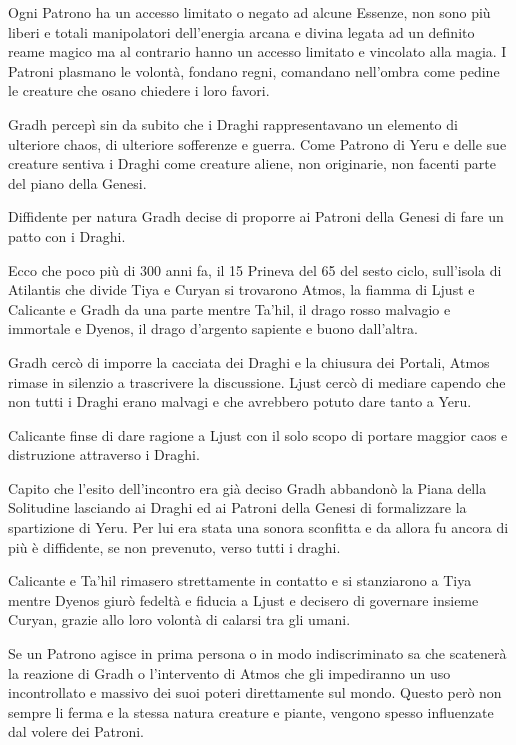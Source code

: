\documentclass[a4paper,11pt,twoside,openany]{book}
\begin{document}
{Ogni Patrono ha un accesso limitato o negato ad alcune Essenze, non sono più liberi e totali manipolatori dell'energia arcana e divina legata ad un definito reame magico ma al contrario hanno un accesso limitato e vincolato alla magia. 
I Patroni plasmano le volontà, fondano regni, comandano nell'ombra come pedine le creature che osano chiedere i loro favori.

Gradh percepì sin da subito che i Draghi rappresentavano un elemento di ulteriore chaos, di ulteriore sofferenze e guerra. Come Patrono di Yeru e delle sue creature sentiva i Draghi come creature aliene, non originarie, non facenti parte del piano della Genesi.

Diffidente per natura Gradh decise di proporre ai Patroni della Genesi di fare un patto con i Draghi.

Ecco che poco più di 300 anni fa, il 15 Prineva del 65 del sesto ciclo, sull'isola di Atilantis che divide Tiya e Curyan si trovarono Atmos, la fiamma di Ljust e Calicante e Gradh da una parte mentre Ta'hil, il drago rosso malvagio e immortale e Dyenos, il drago d'argento sapiente e buono dall'altra.

Gradh cercò di imporre la cacciata dei Draghi e la chiusura dei Portali, Atmos rimase in silenzio a trascrivere la discussione. Ljust cercò di mediare capendo che non tutti i Draghi erano malvagi e che avrebbero potuto dare tanto a Yeru.

Calicante finse di dare ragione a Ljust con il solo scopo di portare maggior caos e distruzione attraverso i Draghi.

Capito che l'esito dell'incontro era già deciso Gradh abbandonò la Piana della Solitudine lasciando ai Draghi ed ai Patroni della Genesi di formalizzare la spartizione di Yeru. Per lui era stata una sonora sconfitta e da allora fu ancora di più è diffidente, se non prevenuto, verso tutti i draghi.

Calicante e Ta'hil rimasero strettamente in contatto e si stanziarono a Tiya mentre Dyenos giurò fedeltà e fiducia a Ljust e decisero di governare insieme Curyan, grazie allo loro volontà di calarsi tra gli umani.

Se un Patrono agisce in prima persona o in modo indiscriminato sa che scatenerà la reazione di Gradh o l'intervento di Atmos che gli impediranno un uso incontrollato e massivo dei suoi poteri direttamente sul mondo. Questo però non sempre li ferma e la stessa natura creature e piante, vengono spesso influenzate dal volere dei Patroni.

}
\end{document}
